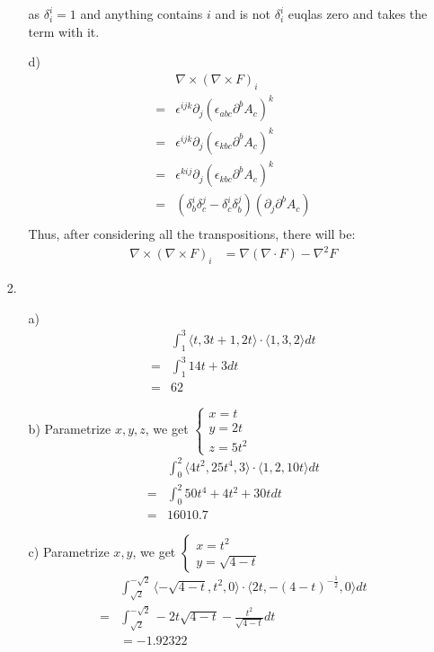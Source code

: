 \documentclass{article}
\begin{document}
\begin{itemize}
\begin{itemize}
        as \(\delta^i_i=1\) and anything contains \(i\) and is not \(\delta^i_i\) euqlas zero and takes the term with it.
        \item [d)]
        \begin{align*}
            &\nabla\times\left(\nabla\times F\right)_i\\
            =&\epsilon^{ijk}\partial_j(\epsilon_{abc} \partial^b A_c)^k\\
            =&\epsilon^{ijk}\partial_j(\epsilon_{kbc} \partial^b A_c)^k\\
            =&\epsilon^{kij}\partial_j(\epsilon_{kbc} \partial^b A_c)^k\\
            =&(\delta^{i}_{b}\delta^{j}_{c}- \delta^{i}_{c}\delta^{j}_{b})(\partial_j\partial^bA_c)\\
        \end{align*}
        Thus, after considering all the transpositions, there will be:
        \begin{align*}
            \nabla\times\left(\nabla\times F\right)_i &= \nabla(\nabla\cdot F)-\nabla^2 F
        \end{align*}
    \end{itemize}
    \item [2.]
    \begin{itemize}
        \item [a)]
        \begin{align*}
            &\int_{1}^{3}\langle t,3t+1,2t\rangle\cdot\langle1,3,2\rangle dt\\
            =&\int_{1}^{3}14t+3 dt\\
            =&62
        \end{align*}
        \item [b)] Parametrize \(x,y,z\), we get \(\left\{\begin{matrix}
            x=t\\
            y=2t\\
            z=5t^2
        \end{matrix}\right.\)
        \begin{align*}
            &\int_{0}^{2} \langle 4t^2,25t^4,3\rangle\cdot\langle1,2,10t\rangle dt\\
            =&\int_{0}^{2} 50t^4+4t^2+30tdt\\
            =&16010.7
        \end{align*}
        \item [c)]Parametrize \(x,y\), we get \(\left\{\begin{matrix}
            x=t^2\\
            y=\sqrt{4-t}
        \end{matrix}\right.\)
        \begin{align*}
            &\int_{\sqrt{2}}^{-\sqrt{2}}\langle-\sqrt{4-t},t^2,0\rangle\cdot\langle2t,-(4-t)^{-\frac{1}{2}},0 \rangle dt\\
            =&\int_{\sqrt{2}}^{-\sqrt{2}}-2t\sqrt{4-t}-\frac{t^2}{\sqrt{4-t}} dt\\
            &=-1.92322
        \end{align*}
    \end{itemize}
\end{itemize}
\end{document}

